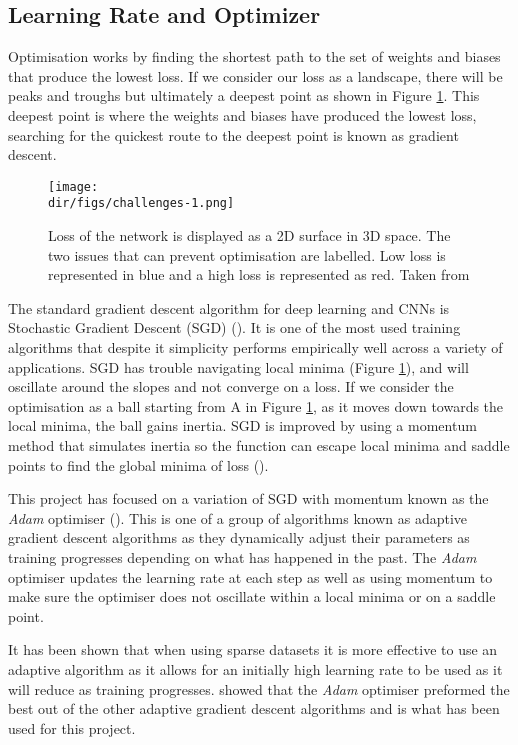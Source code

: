 \subsection{Learning Rate and Optimizer}
Optimisation works by finding the shortest path to the set of weights and biases that produce the lowest loss. If we consider our loss as a landscape, there will be peaks and troughs but ultimately a deepest point as shown in Figure \ref{fig.loss_landscape}. This deepest point is where the weights and biases have produced the lowest loss, searching for the quickest route to the deepest point is known as gradient descent.
\begin{figure}[htbp]
    \centering
    \texttt{[image: \\dir/figs/challenges-1.png]}
    \caption[3D Schematic of CNN Loss]{Loss of the network is displayed as a 2D surface in 3D space. The  two issues that can prevent optimisation are labelled. Low loss is represented in blue and a high loss is represented as red. Taken from \citet{kathuria18}}
    \label{fig.loss_landscape}
\end{figure}
\par
The standard gradient descent algorithm for deep learning and CNNs is Stochastic Gradient Descent (SGD) (\cite{robbins51}). It is one of the most used training algorithms that despite it simplicity performs empirically well across a variety of applications. SGD has trouble navigating local minima (Figure \ref{fig.loss_landscape}), and will oscillate around the slopes and not converge on a loss. If we consider the optimisation as a ball starting from A in Figure \ref{fig.loss_landscape}, as it moves down towards the local minima, the ball gains inertia. SGD is improved by using a momentum method that simulates inertia so the function can escape local minima and saddle points to find the global minima of loss (\cite{ruder16}). 
\par
This project has focused on a variation of SGD with momentum known as the \textit{Adam} optimiser (\cite{kingma14}). This is one of a group of algorithms known as adaptive gradient descent algorithms as they dynamically adjust their parameters as training progresses depending on what has happened in the past. The \textit{Adam} optimiser updates the learning rate at each step as well as using momentum to make sure the optimiser does not oscillate within a local minima or on a saddle point. 
\par
It has been shown that when using sparse datasets it is more effective to use an adaptive algorithm as it allows for an initially high learning rate to be used as it will reduce as training progresses. \citet{kingma14} showed that the \textit{Adam} optimiser preformed the best out of the other adaptive gradient descent algorithms and is what has been used for this project. 
